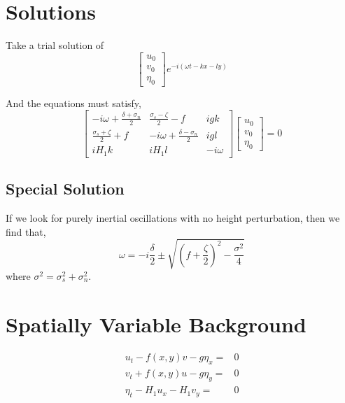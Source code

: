 \documentclass[11pt]{amsart}
\begin{document}
%
%
\section{Solutions}
%
%

Take a trial solution of
\begin{equation}
\left[\begin{array}{c}u_0 \\v_0 \\ \eta_0\end{array}\right]
e^{-i(\omega t - kx - ly)}
\end{equation}

And the equations must satisfy,
\begin{equation}
\left[\begin{array}{ccc}
-i\omega + \frac{\delta + \sigma_n}{2} & \frac{ \sigma_s - \zeta}{2} -f & igk \\
\frac{ \sigma_s + \zeta}{2}  + f  & -i\omega + \frac{ \delta - \sigma_n}{2} & igl \\
i H_1 k & i H_1 l & -i\omega
\end{array}\right]
\left[\begin{array}{c}u_0 \\v_0 \\ \eta_0\end{array}\right]
=0
\end{equation}

\subsection{Special Solution}

If we look for purely inertial oscillations with no height perturbation, then we find that,
\begin{equation}
\omega = -i \frac{\delta}{2} \pm \sqrt{ \left( f + \frac{\zeta}{2} \right)^2 - \frac{\sigma^2}{4} }
\end{equation}
where $\sigma^2 = \sigma_s^2 + \sigma_n^2$.

\section{Spatially Variable Background}

\begin{align}
u_t  - f(x,y) v - g\eta_x =& 0 \\
v_t + f(x,y) u - g\eta_y =& 0 \\
\eta_t - H_1 u_x - H_1 v_y =&0
\end{align}
\end{document}
